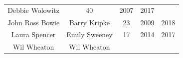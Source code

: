 \documentclass[]{book}
\theoremstyle{definition}
\theoremstyle{definition}
\theoremstyle{definition}
\theoremstyle{remark}
\begin{document}
\begin{longtable}[]{@{}ccccc@{}}
\begin{minipage}[t]{0.28\columnwidth}
Debbie Wolowitz\strut
\end{minipage} & \begin{minipage}[t]{0.12\columnwidth}\centering\strut
40\strut
\end{minipage} & \begin{minipage}[t]{0.14\columnwidth}\centering\strut
2007\strut
\end{minipage} & \begin{minipage}[t]{0.11\columnwidth}\centering\strut
2017\strut
\end{minipage}\tabularnewline
\begin{minipage}[t]{0.22\columnwidth}\centering\strut
John Ross Bowie\strut
\end{minipage} & \begin{minipage}[t]{0.28\columnwidth}\centering\strut
Barry Kripke\strut
\end{minipage} & \begin{minipage}[t]{0.12\columnwidth}\centering\strut
23\strut
\end{minipage} & \begin{minipage}[t]{0.14\columnwidth}\centering\strut
2009\strut
\end{minipage} & \begin{minipage}[t]{0.11\columnwidth}\centering\strut
2018\strut
\end{minipage}\tabularnewline
\begin{minipage}[t]{0.22\columnwidth}\centering\strut
Laura Spencer\strut
\end{minipage} & \begin{minipage}[t]{0.28\columnwidth}\centering\strut
Emily Sweeney\strut
\end{minipage} & \begin{minipage}[t]{0.12\columnwidth}\centering\strut
17\strut
\end{minipage} & \begin{minipage}[t]{0.14\columnwidth}\centering\strut
2014\strut
\end{minipage} & \begin{minipage}[t]{0.11\columnwidth}\centering\strut
2017\strut
\end{minipage}\tabularnewline
\begin{minipage}[t]{0.22\columnwidth}\centering\strut
Wil Wheaton\strut
\end{minipage} & \begin{minipage}[t]{0.28\columnwidth}\centering\strut
Wil Wheaton\strut
\end{minipage} & \begin{minipage}[t]{0.12\columnwidth}\centering\strut

\end{minipage}
\end{longtable}
\end{document}
